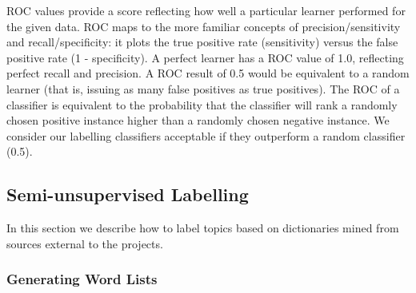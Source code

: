 \documentclass[smallextended]{svjour3}       %
\begin{document}
ROC values provide a score %
 reflecting how well a particular learner performed for the given data. 
ROC maps to the more familiar concepts of precision/sensitivity and recall/specificity: it plots the true positive rate (sensitivity) versus the false
positive rate (1 - specificity). 
A perfect learner has a ROC value of 1.0, reflecting perfect recall and precision. 
A ROC result of 0.5 would be equivalent to a random learner (that is, issuing as many false positives as true positives). 
The %
ROC of a classifier is equivalent to the probability that the classifier will rank a randomly chosen positive instance higher than a randomly chosen
negative instance.
We consider our labelling classifiers acceptable if they outperform a random classifier (0.5). 

\subsection{Semi-unsupervised Labelling}
\label{sec:unsuplabelling}

In this section we describe how to label topics based on dictionaries
mined from sources external to the projects.





\subsubsection{Generating Word Lists}
\end{document}
